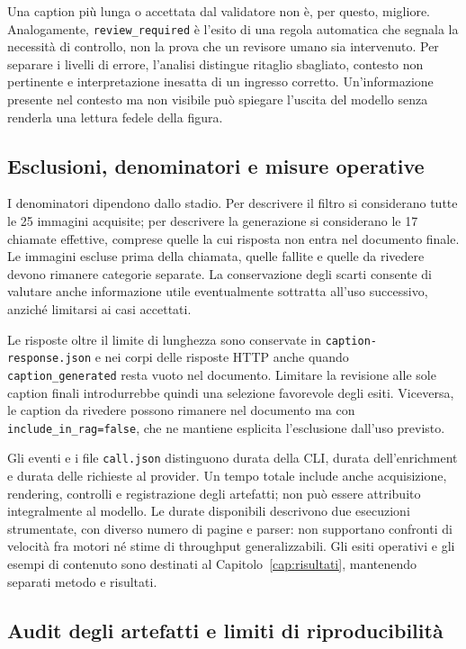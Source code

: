 Una caption più lunga o accettata dal validatore non è, per questo, migliore. Analogamente, \texttt{review\_required} è l'esito di una regola automatica che segnala la necessità di controllo, non la prova che un revisore umano sia intervenuto. Per separare i livelli di errore, l'analisi distingue ritaglio sbagliato, contesto non pertinente e interpretazione inesatta di un ingresso corretto. Un'informazione presente nel contesto ma non visibile può spiegare l'uscita del modello senza renderla una lettura fedele della figura.

\subsection{Esclusioni, denominatori e misure operative}

I denominatori dipendono dallo stadio. Per descrivere il filtro si considerano tutte le 25 immagini acquisite; per descrivere la generazione si considerano le 17 chiamate effettive, comprese quelle la cui risposta non entra nel documento finale. Le immagini escluse prima della chiamata, quelle fallite e quelle da rivedere devono rimanere categorie separate. La conservazione degli scarti consente di valutare anche informazione utile eventualmente sottratta all'uso successivo, anziché limitarsi ai casi accettati.

Le risposte oltre il limite di lunghezza sono conservate in \texttt{caption-response.json} e nei corpi delle risposte HTTP anche quando \texttt{caption\_generated} resta vuoto nel documento. Limitare la revisione alle sole caption finali introdurrebbe quindi una selezione favorevole degli esiti. Viceversa, le caption da rivedere possono rimanere nel documento ma con \texttt{include\_in\_rag=false}, che ne mantiene esplicita l'esclusione dall'uso previsto.

Gli eventi e i file \texttt{call.json} distinguono durata della CLI, durata dell'enrichment e durata delle richieste al provider. Un tempo totale include anche acquisizione, rendering, controlli e registrazione degli artefatti; non può essere attribuito integralmente al modello. Le durate disponibili descrivono due esecuzioni strumentate, con diverso numero di pagine e parser: non supportano confronti di velocità fra motori né stime di throughput generalizzabili. Gli esiti operativi e gli esempi di contenuto sono destinati al Capitolo~\ref{cap:risultati}, mantenendo separati metodo e risultati.

\subsection{Audit degli artefatti e limiti di riproducibilità}
\label{sec:audit-metodi}

